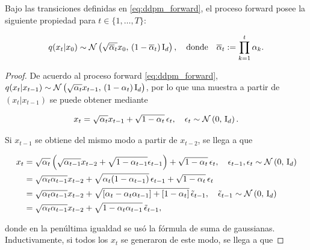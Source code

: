 \begin{prop}
    \label{prop:forward_marginal}
    Bajo las transiciones definidas en \eqref{eq:ddpm_forward}, el proceso forward posee la siguiente propiedad para $t\in\{1,\ldots,T\}$:

    \begin{equation}
        \label{eq:forward_marginal}
        q(x_t|x_0)\sim\mathcal{N}\left(\sqrt{\overline{\alpha}_t}x_0,\,(1-\overline{\alpha}_t)\operatorname{I}_{d}\right),
        \quad\text{donde}\quad
        \overline{\alpha}_t := \prod\limits_{k=1}^t \alpha_k .
    \end{equation}
\end{prop}

\begin{proof}

    De acuerdo al proceso forward \eqref{eq:ddpm_forward}, $q(x_t|x_{t-1}) \sim \mathcal{N}\left(\sqrt{\alpha_t} x_{t-1},\,(1-\alpha_t)\operatorname{I}_{d}\right)$, por lo que una muestra a partir de $(x_t|x_{t-1})$ se puede obtener mediante

    \begin{equation*}
        x_t = \sqrt{\alpha_t} x_{t-1} + \sqrt{1-\alpha_t}\, \epsilon_t,
        \quad
        \epsilon_t\sim\mathcal{N}\left(0,\,\operatorname{I}_{d}\right).
    \end{equation*}

    Si $x_{t-1}$ se obtiene del mismo modo a partir de $x_{t-2}$, se llega a que

    \begin{align*}
        x_t & = \sqrt{\alpha_t} \left(\sqrt{\alpha_{t-1}} x_{t-2} + \sqrt{1-\alpha_{t-1}} \epsilon_{t-1}\right) + \sqrt{1-\alpha_t}\, \epsilon_t, \quad \epsilon_{t-1},\epsilon_t\sim\mathcal{N}\left(0,\,\operatorname{I}_{d}\right) \\
            & = \sqrt{\alpha_t\alpha_{t-1}} x_{t-2} + \sqrt{\alpha_t(1-\alpha_{t-1})}\,\epsilon_{t-1} + \sqrt{1-\alpha_t}\,\epsilon_t                                                                       \\
            & = \sqrt{\alpha_t\alpha_{t-1}} x_{t-2} + \sqrt{[\alpha_t-\alpha_t\alpha_{t-1}]+[1-\alpha_t]}\, \tilde{\epsilon}_{t-1},\quad\tilde{\epsilon}_{t-1}\sim\mathcal{N}\left(0,\,\operatorname{I}_{d}\right)                \\\
            & = \sqrt{\alpha_t\alpha_{t-1}} x_{t-2} + \sqrt{1-\alpha_t\alpha_{t-1}}\, \tilde{\epsilon}_{t-1},
    \end{align*}

    donde en la penúltima igualdad se usó la fórmula de suma de gaussianas. Inductivamente, si todos los $x_t$ se generaron de este modo, se llega a que


\end{proof}
